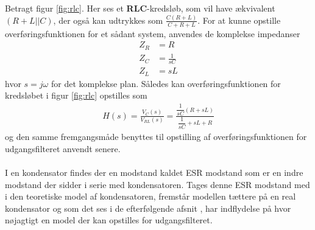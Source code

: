 Betragt figur \ref{fig:rlc}. Her ses et \textbf{RLC}-kredsløb, som vil have ækvivalent $(R+L||C)$, der også kan udtrykkes som $\frac{C(R+L)}{C+R+L}$.
For at kunne opstille overføringsfunktionen for et sådant system, anvendes de komplekse impedanser 
\begin{align}
	Z_R &= R\\
	Z_C &= \frac{1}{sC}\\
	Z_L &= sL
\end{align} 
hvor $s = j\omega$ for det komplekse plan.
Således kan overføringsfunktionen for kredsløbet i figur \ref{fig:rlc} opstilles som
\begin{align}
	H(s) = \frac{V_{C}(s)}{V_{RL}(s)} = \frac{\dfrac{1}{sC}\left(R+ sL\right)}{\dfrac{1}{sC} + sL + R}
\end{align}
og den samme fremgangsmåde benyttes til opstilling af overføringsfunktionen for udgangsfilteret anvendt senere. 
\\\\
I en kondensator findes der en modstand kaldet ESR modstand som er en indre modstand der sidder i serie med kondensatoren. Tages denne ESR modstand med i den teoretiske model af kondensatoren, fremstår modellen tættere på en real kondensator og som det ses i de efterfølgende afsnit , har indflydelse på hvor nøjagtigt en model der kan opstilles for udgangsfilteret. 
